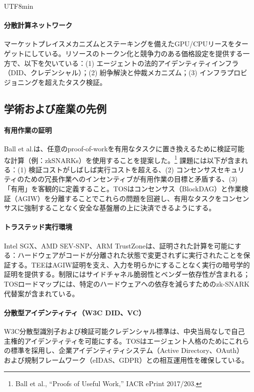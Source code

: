 \documentclass[11pt]{article}
\begin{document}
\begin{CJK}{UTF8}{min}
\paragraph{分散計算ネットワーク} マーケットプレイスメカニズムとステーキングを備えたGPU/CPUリースをターゲットにしている。リソースのトークン化と競争力のある価格設定を提供する一方で、以下を欠いている：(1) エージェントの法的アイデンティティインフラ（DID、クレデンシャル）；(2) 紛争解決と仲裁メカニズム；(3) インフラプロビジョニングを超えたタスク検証。

\subsection{学術および産業の先例}
\paragraph{有用作業の証明} Ball et al.は、任意のproof-of-workを有用なタスクに置き換えるために検証可能な計算（例：zkSNARKs）を使用することを提案した。\footnote{Ball et al., ``Proofs of Useful Work,'' IACR ePrint 2017/203.} 課題には以下が含まれる：(1) 検証コストがしばしば実行コストを超える、(2) コンセンサスセキュリティのための冗長作業へのインセンティブが有用作業の目標と矛盾する、(3) 「有用」を客観的に定義すること。TOSはコンセンサス（BlockDAG）と作業検証（AGIW）を分離することでこれらの問題を回避し、有用なタスクをコンセンサスに強制することなく安全な基盤層の上に決済できるようにする。

\paragraph{トラステッド実行環境} Intel SGX、AMD SEV-SNP、ARM TrustZoneは、証明された計算を可能にする：ハードウェアがコードが分離された状態で変更されずに実行されたことを保証する。TEEはAGIW証明を支え、入力を明らかにすることなく実行の暗号学的証明を提供する。制限にはサイドチャネル脆弱性とベンダー依存性が含まれる；TOSロードマップには、特定のハードウェアへの依存を減らすためのzk-SNARK代替案が含まれている。

\paragraph{分散型アイデンティティ（W3C DID、VC）} W3C分散型識別子および検証可能クレデンシャル標準は、中央当局なしで自己主権的アイデンティティを可能にする。TOSはエージェント人格のためにこれらの標準を採用し、企業アイデンティティシステム（Active Directory、OAuth）および規制フレームワーク（eIDAS、GDPR）との相互運用性を確保している。


\end{CJK}
\end{document}
